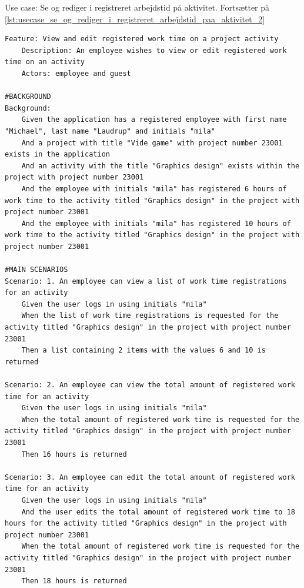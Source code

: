 \begin{listing}[H]
    \centering
    \caption{Use case: Se og rediger i registreret arbejdstid på aktivitet. Fortsætter på \cref{lst:usecase_se_og_rediger_i_registreret_arbejdstid_paa_aktivitet_2}}\label{lst:usecase_se_og_rediger_i_registreret_arbejdstid_paa_aktivitet_1}
    \begin{verbatim}  
Feature: View and edit registered work time on a project activity
    Description: An employee wishes to view or edit registered work time on an activity
    Actors: employee and guest

#BACKGROUND
Background:
    Given the application has a registered employee with first name "Michael", last name "Laudrup" and initials "mila"
    And a project with title "Vide game" with project number 23001 exists in the application
    And an activity with the title "Graphics design" exists within the project with project number 23001
    And the employee with initials "mila" has registered 6 hours of work time to the activity titled "Graphics design" in the project with project number 23001
    And the employee with initials "mila" has registered 10 hours of work time to the activity titled "Graphics design" in the project with project number 23001

#MAIN SCENARIOS
Scenario: 1. An employee can view a list of work time registrations for an activity
    Given the user logs in using initials "mila"
    When the list of work time registrations is requested for the activity titled "Graphics design" in the project with project number 23001
    Then a list containing 2 items with the values 6 and 10 is returned

Scenario: 2. An employee can view the total amount of registered work time for an activity
    Given the user logs in using initials "mila"
    When the total amount of registered work time is requested for the activity titled "Graphics design" in the project with project number 23001
    Then 16 hours is returned

Scenario: 3. An employee can edit the total amount of registered work time for an activity
    Given the user logs in using initials "mila"
    And the user edits the total amount of registered work time to 18 hours for the activity titled "Graphics design" in the project with project number 23001
    When the total amount of registered work time is requested for the activity titled "Graphics design" in the project with project number 23001
    Then 18 hours is returned


\end{verbatim}
\end{listing}
